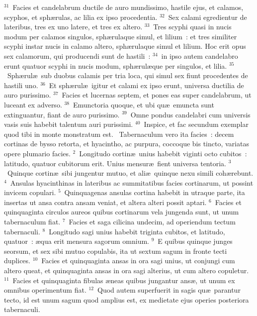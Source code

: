 ${}^{31}$~Facies et candelabrum ductile de auro mundissimo, hastile ejus, et calamos, scyphos, et sph\ae rulas, ac lilia ex ipso procedentia.
${}^{32}$~Sex calami egredientur de lateribus, tres ex uno latere, et tres ex altero.
${}^{33}$~Tres scyphi quasi in nucis modum per calamos singulos, sph\ae rulaque simul, et lilium~: et tres similiter scyphi instar nucis in calamo altero, sph\ae rulaque simul et lilium. Hoc erit opus sex calamorum, qui producendi sunt de hastili~:
${}^{34}$~in ipso autem candelabro erunt quatuor scyphi in nucis modum, sph\ae rul\ae que per singulos, et lilia.
${}^{35}$~Sph\ae rul\ae\ sub duobus calamis per tria loca, qui simul sex fiunt procedentes de hastili uno.
${}^{36}$~Et sph\ae rul\ae\ igitur et calami ex ipso erunt, universa ductilia de auro purissimo.
${}^{37}$~Facies et lucernas septem, et pones eas super candelabrum, ut luceant ex adverso.
${}^{38}$~Emunctoria quoque, et ubi qu\ae\ emuncta sunt extinguantur, fiant de auro purissimo.
${}^{39}$~Omne pondus candelabri cum universis vasis suis habebit talentum auri purissimi.
${}^{40}$~Inspice, et fac secundum exemplar quod tibi in monte monstratum est.
~\lettrine[lines=10,image=true,loversize=0.05,lraise=-0.03]{T}{}abernaculum vero ita facies~: decem cortinas de bysso retorta, et hyacintho, ac purpura, coccoque bis tincto, variatas opere plumario facies.
${}^{2}$~Longitudo cortin\ae\ unius habebit viginti octo cubitos~: latitudo, quatuor cubitorum erit. Unius mensur\ae\ fient universa tentoria.
${}^{3}$~Quinque cortin\ae\ sibi jungentur mutuo, et ali\ae\ quinque nexu simili coh\ae rebunt.
${}^{4}$~Ansulas hyacinthinas in lateribus ac summitatibus facies cortinarum, ut possint invicem copulari.
${}^{5}$~Quinquagenas ansulas cortina habebit in utraque parte, ita insertas ut ansa contra ansam veniat, et altera alteri possit aptari.
${}^{6}$~Facies et quinquaginta circulos aureos quibus cortinarum vela jungenda sunt, ut unum tabernaculum fiat.
${}^{7}$~Facies et saga cilicina undecim, ad operiendum tectum tabernaculi.
${}^{8}$~Longitudo sagi unius habebit triginta cubitos, et latitudo, quatuor~: \ae qua erit mensura sagorum omnium.
${}^{9}$~E quibus quinque junges seorsum, et sex sibi mutuo copulabis, ita ut sextum sagum in fronte tecti duplices.
${}^{10}$~Facies et quinquaginta ansas in ora sagi unius, ut conjungi cum altero queat, et quinquaginta ansas in ora sagi alterius, ut cum altero copuletur.
${}^{11}$~Facies et quinquaginta fibulas \ae neas quibus jungantur ans\ae , ut unum ex omnibus operimentum fiat.
${}^{12}$~Quod autem superfuerit in sagis qu\ae\ parantur tecto, id est unum sagum quod amplius est, ex medietate ejus operies posteriora tabernaculi.
